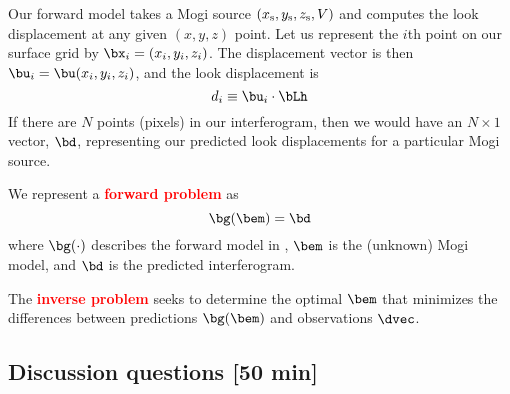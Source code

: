 \documentclass[11pt,titlepage,fleqn]{article}
\begin{document}
Our forward model takes a Mogi source $(x_{\rm s},y_{\rm s},z_{\rm s},V)$ and computes the look displacement at any given $(x,y,z)$ point. Let us represent the $i$th point on our surface grid by $\bx_i = (x_i,y_i,z_i)$. The displacement vector is then $\bu_i = \bu(x_i,y_i,z_i)$, and the look displacement is
%
\begin{equation}
d_i \equiv \bu_i \cdot \bLh
\label{forwardLOS}
\end{equation}
%
If there are $N$ points (pixels) in our interferogram, then we would have an $N \times 1$ vector, $\bd$, representing our predicted look displacements for a particular Mogi source.

We represent a \textcolor{red}{\bf forward problem} as
%
\begin{equation}
\bg(\bem) = \bd
\end{equation}
%
where $\bg(\cdot)$ describes the forward model in , $\bem$ is the (unknown) Mogi model, and $\bd$ is the predicted interferogram.

The \textcolor{red}{\bf inverse problem} seeks to determine the optimal $\bem$ that minimizes the differences between predictions $\bg(\bem)$ and observations $\dvec$.


\subsection*{Discussion questions [50 min]}
\end{document}
